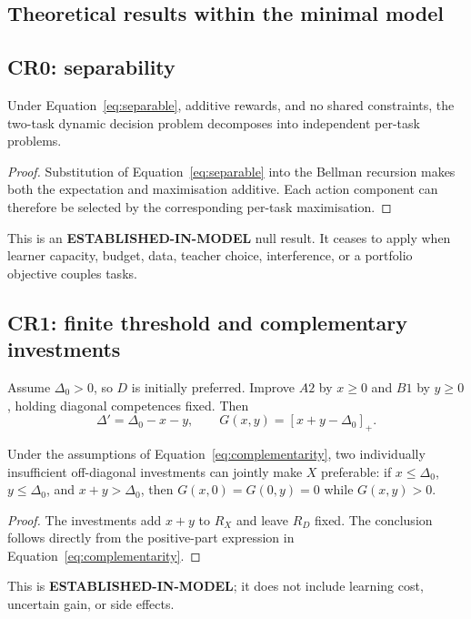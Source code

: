 \subsection{Theoretical results within the minimal model}

\subsection{CR0: separability}
\begin{proposition}
Under Equation~\eqref{eq:separable}, additive rewards, and no shared constraints, the two-task dynamic decision problem decomposes into independent per-task problems.
\end{proposition}
\begin{proof}
Substitution of Equation~\eqref{eq:separable} into the Bellman recursion makes both the expectation and maximisation additive. Each action component can therefore be selected by the corresponding per-task maximisation.
\end{proof}
This is an \textbf{ESTABLISHED-IN-MODEL} null result. It ceases to apply when learner capacity, budget, data, teacher choice, interference, or a portfolio objective couples tasks.

\subsection{CR1: finite threshold and complementary investments}
Assume $\Delta_0>0$, so $D$ is initially preferred. Improve $A2$ by $x\geq0$ and $B1$ by $y\geq0$, holding diagonal competences fixed. Then
\begin{equation}
\Delta'=\Delta_0-x-y,
\qquad
G(x,y)=[x+y-\Delta_0]_+.
\label{eq:complementarity}
\end{equation}
\begin{proposition}
Under the assumptions of Equation~\eqref{eq:complementarity}, two individually insufficient off-diagonal investments can jointly make $X$ preferable: if $x\leq\Delta_0$, $y\leq\Delta_0$, and $x+y>\Delta_0$, then $G(x,0)=G(0,y)=0$ while $G(x,y)>0$.
\end{proposition}
\begin{proof}
The investments add $x+y$ to $R_X$ and leave $R_D$ fixed. The conclusion follows directly from the positive-part expression in Equation~\eqref{eq:complementarity}.
\end{proof}
This is \textbf{ESTABLISHED-IN-MODEL}; it does not include learning cost, uncertain gain, or side effects.

